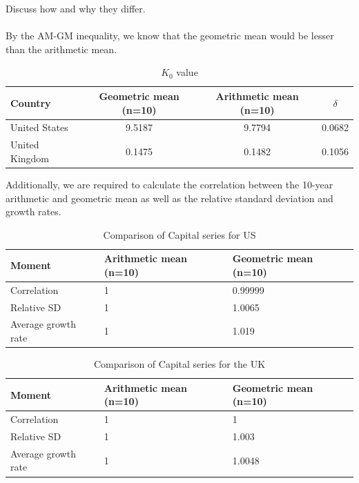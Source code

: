 \documentclass[12pt]{article}
\theoremstyle{mytheoremstyle}
\theoremstyle{mytheoremstyle}
\theoremstyle{myproblemstyle}
\begin{document}
Discuss how and why they differ.
\\ \\
By the AM-GM inequality, we know that the geometric mean would be lesser than the arithmetic mean.

\begin{table}[htbp]
    \centering
    \caption{$K_0$ value }
    \label{tab:table-1}
    \begin{tabular}{@{}lccc@{}}
    \toprule
    Country & Geometric mean (n=10) & Arithmetic mean (n=10) & $\delta$ \\ \midrule
    United States & 9.5187 & 9.7794 & 0.0682 \\
    United Kingdom & 0.1475 & 0.1482 & 0.1056 \\ \bottomrule
    \end{tabular}
    \end{table}

Additionally, we are required to calculate the correlation between the 10-year arithmetic and geometric mean as well as the relative standard deviation and growth rates. 

\begin{table}[htbp]
    \centering
    \caption{Comparison of Capital series for US}
    \label{tab:US_K}
    \begin{tabular}{@{}lll@{}}
    \toprule
    Moment & Arithmetic mean (n=10) & Geometric mean (n=10) \\ \midrule
    Correlation & 1 & 0.99999 \\
    Relative SD & 1 & 1.0065 \\
    Average growth rate & 1 & 1.019 \\ \bottomrule
    \end{tabular}
    \end{table}

\begin{table}[htbp]
    \centering
    \caption{Comparison of Capital series for the UK}
    \label{tab:UK_K}
    \begin{tabular}{@{}lll@{}}
    \toprule
    Moment & Arithmetic mean (n=10) & Geometric mean (n=10) \\ \midrule
    Correlation & 1 & 1 \\
    Relative SD & 1 & 1.003 \\
    Average growth rate & 1 & 1.0048 \\ \bottomrule
    \end{tabular}
    \end{table}
\end{document}
